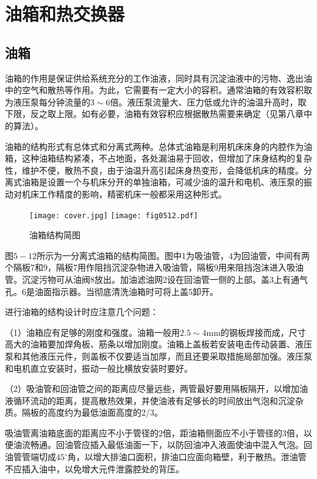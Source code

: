 
\section{油箱和热交换器}
\subsection{油箱}

油箱的作用是保证供给系统充分的工作油液，同时具有沉淀油液中的污物、逸出油中的空气和散热等作用。为此，它需要有一定大小的容积。通常油箱的有效容积取为液压泵每分钟流量的$3 \sim 6$倍。液压泵流量大、压力低或允许的油温升高时，取下限，反之取上限。如有必要，油箱有效容积应根据散热需要来确定（见第八章中的算法）。

油箱的结构形式有总体式和分离式两种。总体式油箱是利用机床床身的内腔作为油箱，这种油箱结构紧凑，不占地面，各处漏油易于回收，但增加了床身结构的复杂性，维护不便，散热不良，由于油温升高引起床身热变形，会降低机床的精度。分离式油箱是设置一个与机床分开的单独油箱，可减少油的温升和电机、液压泵的振动对机床工作精度的影响，精密机床一般都采用这种形式。

\begin{figure}[!hbt]
\centering         
\ifOpenSource
\texttt{[image: cover.jpg]}
\else
\texttt{[image: fig0512.pdf]}
\fi 
\caption{油箱结构简图}   
\label{fig:fig0512}
\end{figure}

图$5-12$所示为一分离式油箱的结构简图。图中1为吸油管，4为回油管，中间有两个隔板7和9，隔板7用作阻挡沉淀杂物进入吸油管，隔板9用来阻挡泡沫进入吸油管。沉淀污物可从油阀8放出。加油滤油网2设在回油管一侧的上部。盖$3$上有通气孔。6是油面指示器。当彻底清洗油箱时可将上盖5卸开。

进行油箱的结构设计时应注意几个问题：

（1）油箱应有足够的刚度和强度。油箱一般用$2.5 \sim 4$mm的钢板焊接而成，尺寸高大的油箱要加焊角板、筋条以增加刚度。油箱上盖板若安装电击传动装置、液压泵和其他液压元件，则盖板不仅要适当加厚，而且还要采取措施局部加强。液压泵和电机直立安装时，振动一般比横放安装时要好。

（2）吸油管和回油管之间的距离应尽量远些，两管最好要用隔板隔开，以增加油液循环流动的距离，提高散热效果，并使油液有足够长的时间放出气泡和沉淀杂质。隔板的高度约为最低油面高度的2/3。

吸油管离油箱底面的距离应不小于管径的$2$倍，距油箱侧面应不小于管径的3倍，以便油流畅通。回油管应插入最低油面一下，以防回油冲入液面使油中混入气泡。回油管管端切成$45^\circ$角，以增大排油口面积，排油口应面向箱壁，利于散热。泄油管不应插入油中，以免增大元件泄露腔处的背压。

